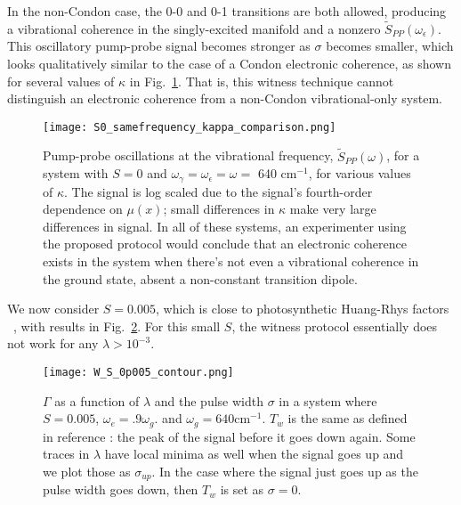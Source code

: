 In the non-Condon case, the 0-0 and 0-1 transitions are both allowed, producing a vibrational coherence in the singly-excited manifold and a nonzero $\tilde{S}_{PP}(\omega_\epsilon)$. This oscillatory pump-probe signal becomes stronger as $\sigma$ becomes smaller, which looks qualitatively similar to the case of a Condon electronic coherence, as shown for several values of $\kappa$ in Fig.\ \ref{fig:tunedZero}. That is, this witness technique cannot distinguish an electronic coherence from a non-Condon vibrational-only system.

\begin{figure}
   \texttt{[image: S0\_samefrequency\_kappa\_comparison.png]}
   \caption{Pump-probe oscillations at the vibrational frequency, $\tilde{S}_{PP} ( \omega)$, for a system with $S=0$ and $\omega_{\gamma} = \omega_{\epsilon} = \omega = $ 640 cm$^{-1}$, for various values of $\kappa$.  The signal is log scaled due to the signal's fourth-order dependence on $\mu(x)$; small differences in $\kappa$ make very large differences in signal.  In all of these systems, an experimenter using the proposed protocol would conclude that an electronic coherence exists in the system when there's not even a vibrational coherence in the ground state, absent a non-constant transition dipole. }
	\label{fig:tunedZero}
\end{figure}


We now consider $S=0.005$, which is close to photosynthetic Huang-Rhys factors ~\cite{typicalHRFforPhotosynthesis}, with results in Fig.\ \ref{fig:s_0p005}.  For this small $S$, the witness protocol essentially does not work for any $\lambda>10^{-3}$.

\begin{figure}
   \texttt{[image: W\_S\_0p005\_contour.png]}
   \caption{$\Gamma$ as a function of $\lambda$ and the pulse width $\sigma$ in a system where $S=0.005$, $\omega_e = .9 \omega_g$. and $\omega_g = 640 \text{cm}^{-1}$. $T_w$ is the same as defined in reference \cite{allanWitness}: the peak of the signal before it goes down again.   Some traces in $\lambda$ have local minima as well when the signal goes up and we plot those as $\sigma_{up}$.  In the case where the signal just goes up as the pulse width goes down, then $T_w$ is set as $\sigma=0$.  }
	\label{fig:s_0p005}
\end{figure}


